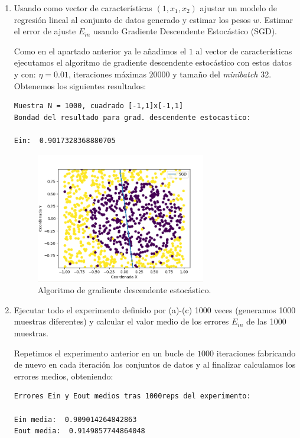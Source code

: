 \documentclass[size=a4, parskip=half, titlepage=false, toc=flat, toc=bib, 12pt]{scrartcl}
\begin{document}
\begin{enumerate}
\begin{enumerate}
\item Usando como vector de características $(1, x_1 , x_2 )$ ajustar un modelo de regresión
lineal al conjunto de datos generado y estimar los pesos $w$. Estimar el error de
ajuste $E_{in}$ usando Gradiente Descendente Estocástico (SGD).

Como en el apartado anterior ya le añadimos el $1$ al vector de características ejecutamos
el algoritmo de gradiente descendente estocástico con estos datos y con: $\eta = 0.01$, iteraciones
máximas $20000$ y tamaño del \textit{minibatch} 32. Obtenemos los siguientes resultados:

\begin{lstlisting}
Muestra N = 1000, cuadrado [-1,1]x[-1,1]
Bondad del resultado para grad. descendente estocastico:

Ein:  0.9017328368880705
\end{lstlisting}
\begin{figure}[H]
\centering
\includegraphics[width=0.7\textwidth]{./img/ej25}
\caption{Algoritmo de gradiente descendente estocástico.}
\end{figure}

\item Ejecutar todo el experimento definido por (a)-(c) 1000 veces (generamos 1000
muestras diferentes) y calcular el valor medio de los errores $E_{in}$ de las 1000 muestras.

Repetimos el experimento anterior en un bucle de $1000$ iteraciones fabricando de nuevo en cada
iteración los conjuntos de datos y al finalizar calculamos los errores medios, obteniendo:

\begin{lstlisting}
Errores Ein y Eout medios tras 1000reps del experimento:

Ein media:  0.909014264842863
Eout media:  0.9149857744864048
\end{lstlisting}


\end{enumerate}
\end{enumerate}
\end{document}
